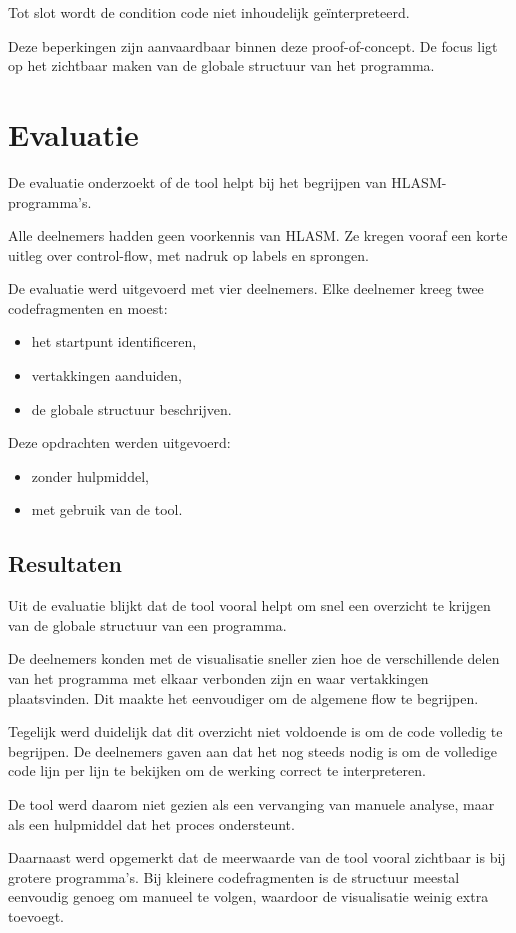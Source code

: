 Tot slot wordt de condition code niet inhoudelijk geïnterpreteerd.  

Deze beperkingen zijn aanvaardbaar binnen deze proof-of-concept.  
De focus ligt op het zichtbaar maken van de globale structuur van het programma.

\newpage

\section{Evaluatie}

De evaluatie onderzoekt of de tool helpt bij het begrijpen van HLASM-programma’s.

Alle deelnemers hadden geen voorkennis van HLASM.  
Ze kregen vooraf een korte uitleg over control-flow, met nadruk op labels en sprongen.

De evaluatie werd uitgevoerd met vier deelnemers.  
Elke deelnemer kreeg twee codefragmenten en moest:
\begin{itemize}
    \item het startpunt identificeren,
    \item vertakkingen aanduiden,
    \item de globale structuur beschrijven.
\end{itemize}

Deze opdrachten werden uitgevoerd:
\begin{itemize}
    \item zonder hulpmiddel,
    \item met gebruik van de tool.
\end{itemize}

\subsection{Resultaten}

Uit de evaluatie blijkt dat de tool vooral helpt om snel een overzicht te krijgen van de globale structuur van een programma.

De deelnemers konden met de visualisatie sneller zien hoe de verschillende delen van het programma met elkaar verbonden zijn en waar vertakkingen plaatsvinden. Dit maakte het eenvoudiger om de algemene flow te begrijpen.

Tegelijk werd duidelijk dat dit overzicht niet voldoende is om de code volledig te begrijpen.  
De deelnemers gaven aan dat het nog steeds nodig is om de volledige code lijn per lijn te bekijken om de werking correct te interpreteren.

De tool werd daarom niet gezien als een vervanging van manuele analyse, maar als een hulpmiddel dat het proces ondersteunt.

Daarnaast werd opgemerkt dat de meerwaarde van de tool vooral zichtbaar is bij grotere programma’s.  
Bij kleinere codefragmenten is de structuur meestal eenvoudig genoeg om manueel te volgen, waardoor de visualisatie weinig extra toevoegt.
